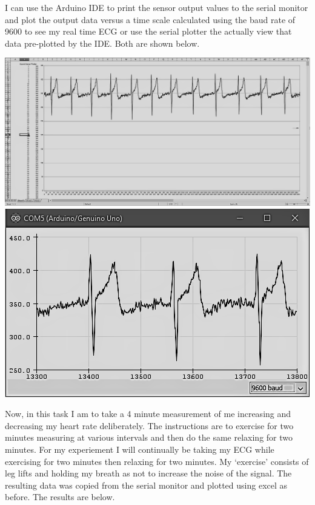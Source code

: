 \documentclass[12pt]{article}
\begin{document}
				I can use the Arduino IDE to print the sensor output values to the serial monitor and plot the output data
 				versus a time scale calculated using the baud rate of 9600 to see my real time ECG or use the serial plotter 
				the actually view that data pre-plotted by the IDE.  Both are shown below.
				
				\begin{center}
					\includegraphics[scale=0.165]{monitor.PNG}\\
					\vspace{1cm}
					\includegraphics[scale=0.6]{plotter.PNG}
				\end{center}

				Now, in this task I am to take a 4 minute measurement of me increasing and decreasing my heart rate
				deliberately.  The instructions are to exercise for two minutes measuring at various intervals and then do 
				the same relaxing for two minutes.  For my experiement I will continually be taking my ECG while exercising
				for two minutes then relaxing for two minutes.  My `exercise' consists of leg lifts and holding my breath as
				not to increase the noise of the signal.  The resulting data was copied from the serial monitor and plotted
				using excel as before. The results are below.
				
\end{document}
